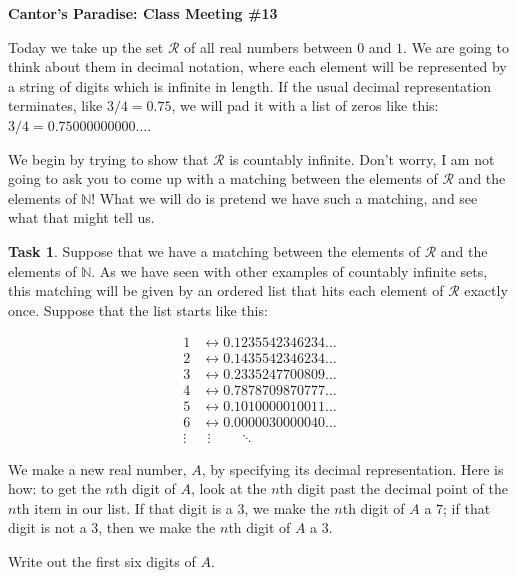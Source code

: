 \documentclass[12pt]{amsart}
\theoremstyle{definition}
\newtheorem{task}{Task}
\begin{document}
\begin{center}
\textbf{\Huge
Cantor's Paradise: Class Meeting \#13
}
\end{center}


\vspace{.5in}

Today we take up  the set $\mathcal{R}$ of all real numbers between $0$ and $1$.
We are going to think about them in decimal notation, where each element will be represented by a string of digits which is infinite in length.
If the usual decimal representation terminates, like $3/4 = 0.75$, we will pad it with a list of zeros like this: $3/4 = 0.75000000000\dots$.

We begin by trying to show that $\mathcal{R}$ is countably infinite.
Don't worry, I am not going to ask you to come up with a matching between the elements of $\mathcal{R}$ and the elements of $\mathbb{N}$!
What we will do is pretend we have such a matching, and see what that might tell us.

\begin{task}
Suppose that we have a matching between the elements of $\mathcal{R}$ and the elements of $\mathbb{N}$.
As we have seen with other examples of countably infinite sets, this matching will be given by an ordered list that hits each element of $\mathcal{R}$ exactly once.
Suppose that the list starts like this:

\begin{align*}
1 & \leftrightarrow  0.1235542346234 \dots \\
2 & \leftrightarrow  0.1435542346234 \dots \\
3 & \leftrightarrow  0.2335247700809 \dots \\
4 & \leftrightarrow  0.7878709870777 \dots \\
5 & \leftrightarrow  0.1010000010011 \dots \\
6 & \leftrightarrow  0.0000030000040 \dots \\
\vdots & \ \ \vdots  \qquad \ddots
\end{align*}

We make a new real number, $A$, by specifying its decimal representation.
Here is how: to get the $n$th digit of $A$, look at the $n$th digit past the decimal point of the $n$th item in our list.
If that digit is a $3$, we make the $n$th digit of $A$ a $7$; if that digit is not a $3$, then we make the $n$th digit of $A$ a $3$.

Write out the first six digits of $A$.

\end{task}
\end{document}
